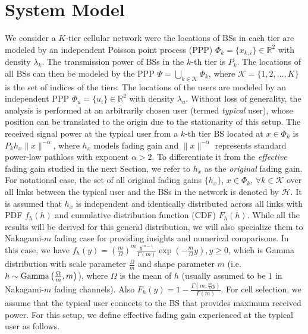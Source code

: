 \documentclass[final]{IEEEtran}
\begin{document}
\section{System Model} \label{sec:SysMod}
We consider a $K$-tier cellular network were the locations of BSs in each tier are modeled by an independent Poisson point process (PPP) $\Phi_k=\{x_{k,i}\}\in\mathbb{R}^2$ with density $\lambda_k$. The transmission power of BSs in the $k$-th tier is $P_k$. The locations of all BSs can then be modeled by the PPP $\Psi=\bigcup_{k\in\mathcal{K}}\Phi_k$, where $\mathcal{K}=\{1,2,\dots,K\}$ is the set of indices of the tiers. The locations of the users are modeled by an independent PPP $\Phi_u=\{u_{i}\}\in\mathbb{R}^2$ with density $\lambda_u$. Without loss of generality, the analysis is performed at an arbitrarily chosen user (termed {\em typical} user), whose position can be translated to the origin due to the stationarity of this setup. 
The received signal power at the typical user from a $k$-th tier BS located at $x \in \Phi_k$ is $P_k h_{x}\|x\|^{-\alpha}$, where $h_x$ models fading gain and $\|x\|^{-\alpha}$ represents standard power-law pathloss with exponent $\alpha>2$. %
To differentiate it from the {\em effective} fading gain studied in the next Section, we refer to $h_{x}$ as the {\em original} fading gain. For notational ease, the set of all original fading gains $\{h_x\}$, $x\in \Phi_k$, $\forall k \in \mathcal{K}$ over all links between the typical user and the BSs in the network is denoted by $\mathcal{H}$. 
It is assumed that $h_x$ is independent and identically distributed across all links with PDF $f_h(h)$ and cumulative distribution function (CDF) $F_h(h)$. While all the results will be derived for this general distribution, we will also specialize them to Nakagami-$m$ fading case for providing insights and numerical comparisons. In this case, we have ${f}_{h}(y)= \left(\frac{m}{\Omega}\right)^m\frac{y^{m-1}}{\Gamma(m)} \exp(-\frac{m}{\Omega}y), y\geq 0$, which is Gamma distribution with scale parameter $\frac{\Omega}{m}$ and shape parameter $m$ (i.e. $h\sim \textnormal{Gamma}\left(\frac{\Omega}{m},m\right)$), where $\Omega$ is the mean of $h$ (usually assumed to be $1$ in Nakagami-$m$ fading channels). Also $F_h(y)= 1- \frac{\Gamma(m,\frac{m}{\Omega}y)}{\Gamma(m)}$. For cell selection, we assume that the typical user connects to the BS that provides maximum received power. For this setup, we define effective fading gain experienced at the typical user as follows. 
\end{document}
